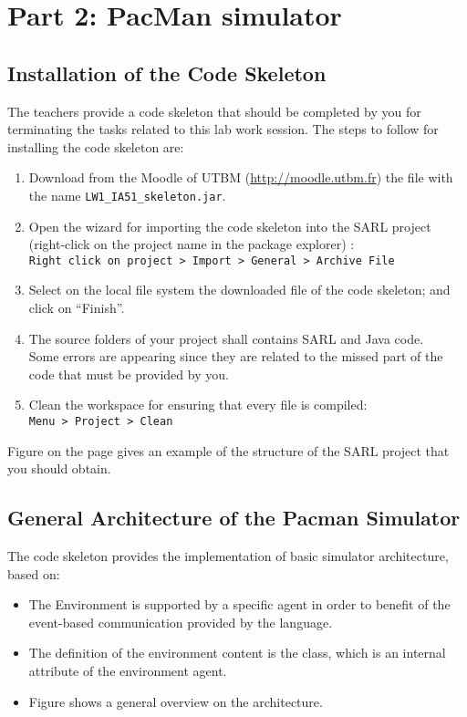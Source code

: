 \documentclass[article,english,nodocumentinfo]{multiagentfrreport}
\gdef\skeletonName{\texttt{\mbox{LW1\_IA51\_skeleton\string.jar}}}
\begin{document}
\section{Part 2: PacMan simulator}

\subsection{Installation of the Code Skeleton}

The teachers provide a code skeleton that should be completed by you for terminating the tasks related to this lab work session.
The steps to follow for installing the code skeleton are:
\begin{enumerate}
\item Download from the Moodle of UTBM (\url{http://moodle.utbm.fr}) the file with the name \skeletonName.
\item Open the wizard for importing the code skeleton into the SARL project (right-click on the project name in the package explorer)	: \\
	\texttt{Right click on project > Import > General > Archive File}
\item Select on the local file system the downloaded file of the code skeleton; and click on ``Finish''.
\item The source folders of your project shall contains SARL and Java code. \\
	Some errors are appearing since they are related to the missed part of the code that must be provided by you. 
\item Clean the workspace for ensuring that every file is compiled: \\
	\texttt{Menu > Project > Clean}
\end{enumerate}

Figure  on the page  gives an example of the structure of the SARL project that you should obtain.


\subsection{General Architecture of the Pacman Simulator}

The code skeleton provides the implementation of basic simulator architecture, based on:
\begin{itemize}
\item The Environment is supported by a specific agent in order to benefit of the event-based communication provided by the \sarl language.
\item The definition of the environment content is the  class, which is an internal attribute of the environment agent.
\item Figure  shows a general overview on the architecture.
\end{itemize}
\end{document}
